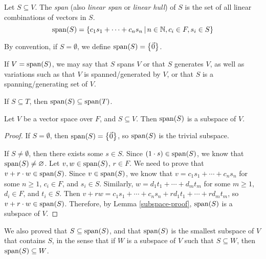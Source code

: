 \begin{defn}
    Let $S \subseteq V$. The \emph{span} (also \emph{linear span} or \emph{linear hull}) of $S$ is the set of all linear combinations of vectors in $S$. \[\operatorname{span}(S) = \left\{c_1s_1 + \cdots + c_ns_n \,\middle|\, n \in \mathbb{N}, c_i \in F, s_i \in S\right\}\]

    By convention, if $S = \emptyset$, we define $\operatorname{span}(S) = \left\{\vec{0}\right\}$.
\end{defn}

\begin{rmk}
    If $V = \operatorname{span}(S)$, we may say that $S$ spans $V$ or that $S$ generates $V$, as well as variations such as that $V$ is spanned/generated by $V$, or that $S$ is a spanning/generating set of $V$.
\end{rmk}

\begin{rmk}
    If $S \subseteq T$, then $\operatorname{span}(S) \subseteq \operatorname{span}(T)$.
\end{rmk}

\begin{lemma}
    Let $V$ be a vector space over $F$, and $S \subseteq V$. Then $\operatorname{span}(S)$ is a subspace of $V$.
\end{lemma}

\begin{proof}
    If $S = \emptyset$, then $\operatorname{span}(S) = \left\{\vec{0}\right\}$, so $\operatorname{span}(S)$ is the trivial subspace.

    If $S \neq \emptyset$, then there exists some $s \in S$. Since $(1 \cdot s) \in \operatorname{span}(S)$, we know that $\operatorname{span}(S) \neq \varnothing$. Let $v, w \in \operatorname{span}(S)$, $r \in F$. We need to prove that $v + r \cdot w \in \operatorname{span}(S)$. Since $v \in \operatorname{span}(S)$, we know that $v = c_1s_1 + \cdots + c_ns_n$ for some $n \geq 1$, $c_i \in F$, and $s_i \in S$. Similarly, $w = d_1t_1 + \cdots + d_mt_m$ for some $m \geq 1$, $d_i \in F$, and $t_i \in S$. Then $v + rw = c_1s_1 + \cdots + c_ns_n + rd_1t_1 + \cdots + rd_mt_m$, so $v + r \cdot w \in \operatorname{span}(S)$. Therefore, by Lemma \ref{subspace-proof}, $\operatorname{span}(S)$ is a subspace of $V$.
\end{proof}

\begin{rmk}
    We also proved that $S \subseteq \operatorname{span}(S)$, and that $\operatorname{span}(S)$ is the smallest subspace of $V$ that contains $S$, in the sense that if $W$ is a subspace of $V$ such that $S \subseteq W$, then $\operatorname{span}(S) \subseteq W$.
\end{rmk}

